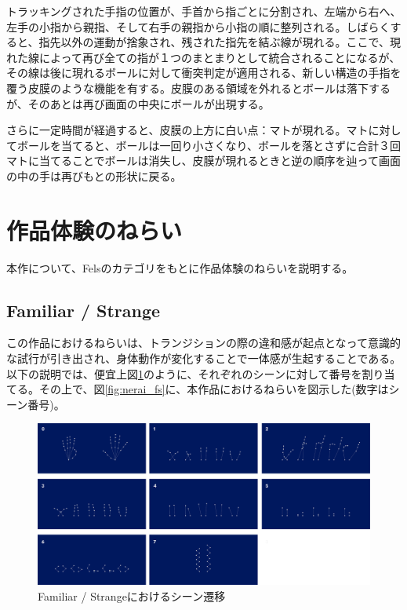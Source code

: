 トラッキングされた手指の位置が、手首から指ごとに分割され、左端から右へ、左手の小指から親指、そして右手の親指から小指の順に整列される。しばらくすると、指先以外の運動が捨象され、残された指先を結ぶ線が現れる。ここで、現れた線によって再び全ての指が１つのまとまりとして統合されることになるが、その線は後に現れるボールに対して衝突判定が適用される、新しい構造の手指を覆う皮膜のような機能を有する。皮膜のある領域を外れるとボールは落下するが、そのあとは再び画面の中央にボールが出現する。

さらに一定時間が経過すると、皮膜の上方に白い点：マトが現れる。マトに対してボールを当てると、ボールは一回り小さくなり、ボールを落とさずに合計３回マトに当てることでボールは消失し、皮膜が現れるときと逆の順序を辿って画面の中の手は再びもとの形状に戻る。

\section{作品体験のねらい}
\label{nerai}
本作について、Felsのカテゴリをもとに作品体験のねらいを説明する。

\subsection*{Familiar / Strange}
この作品におけるねらいは、トランジションの際の違和感が起点となって意識的な試行が引き出され、身体動作が変化することで一体感が生起することである。以下の説明では、便宜上図\ref{fig:diagram_familiar_strange}のように、それぞれのシーンに対して番号を割り当てる。その上で、図\ref{fig:nerai_fs}に、本作品におけるねらいを図示した(数字はシーン番号)。

\begin{figure}[H]
  \centering
  \includegraphics[width=15cm]{img/handpose-sequence.png}
  \caption{Familiar / Strangeにおけるシーン遷移}
  \label{fig:diagram_familiar_strange}
\end{figure}

